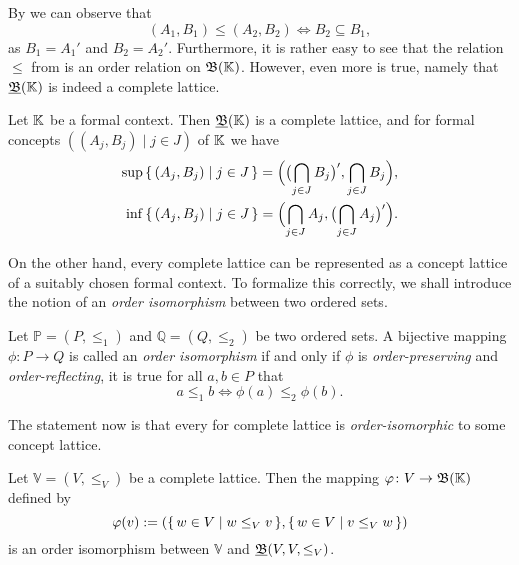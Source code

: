 By  we can observe that
\begin{equation*}
  (A_1, B_1) \leq (A_2, B_2) \iff B_2 \subseteq B_1,
\end{equation*}
as $B_1 = A_1'$ and $B_2 = A_2'$.  Furthermore, it is rather easy to see that the relation
$\leq$ from  is an order relation on $\operatorname{{\mathfrak{B}}}({\mathbb{K}})$.  However,
even more is true, namely that ${\underline{\operatorname{{\mathfrak{B}}}}}({\mathbb{K}})$ is indeed a complete lattice.

\begin{Theorem}
  \label{thm:concept-lattices-are-complete-lattices}
  Let ${\mathbb{K}}$ be a formal context.  Then ${\underline{\operatorname{{\mathfrak{B}}}}}({\mathbb{K}})$ is a complete lattice, and
  for formal concepts $((A_j, B_j) \mid j \in J)$ of ${\mathbb{K}}$ we have
  \begin{align*}
    \sup {\ensuremath{\{\, (A_j, B_j) \mid j \in J \,\}}} = \Bigl( \bigl( \bigcap_{j \in J} B_j \bigr)' ,
    \bigcap_{j \in J} B_j \Bigr), \\
    \inf {\ensuremath{\{\, (A_j, B_j) \mid j \in J \,\}}} = \Bigl( \bigcap_{j \in J} A_j, \bigl( \bigcap_{j
      \in J} A_j \bigr)' \Bigr).
  \end{align*}
\end{Theorem}

On the other hand, every complete lattice can be represented as a concept lattice of a
suitably chosen formal context.  To formalize this correctly, we shall introduce the
notion of an \emph{order isomorphism} between two ordered sets.

\begin{Definition}
  \label{def:order-isomorphism}
  Let $\mathbb P = (P, \leq_1)$ and $\mathbb Q = (Q, \leq_2)$ be two ordered sets.  A
  bijective mapping $\phi \colon P \to Q$ is called an \emph{order isomorphism} if and
  only if $\phi$ is \emph{order-preserving} and \emph{order-reflecting}, \ie it is true
  for all $a, b \in P$ that
  \begin{equation*}
    a \leq_1 b \iff \phi(a) \leq_2 \phi(b).
  \end{equation*}
\end{Definition}

The statement now is that every for complete lattice is \emph{order-isomorphic} to some
concept lattice.

\begin{Theorem}
  \label{thm:complete-lattices-are-concept-lattices}
  Let $\mathbb V = (V, \leq_V)$ be a complete lattice.  Then the mapping $\varphi \colon V
  \to \operatorname{{\mathfrak{B}}}({\mathbb{K}})$ defined by
  \begin{equation*}
    \varphi(v) := ({\{\, w \in V \mid w \leq_V v\,\}}, {\{\, w \in V \mid v \leq_V w \,\}})
  \end{equation*}
  is an order isomorphism between $\mathbb V$ and ${\underline{\operatorname{{\mathfrak{B}}}}}(V, V, \leq_V)$.
\end{Theorem}

